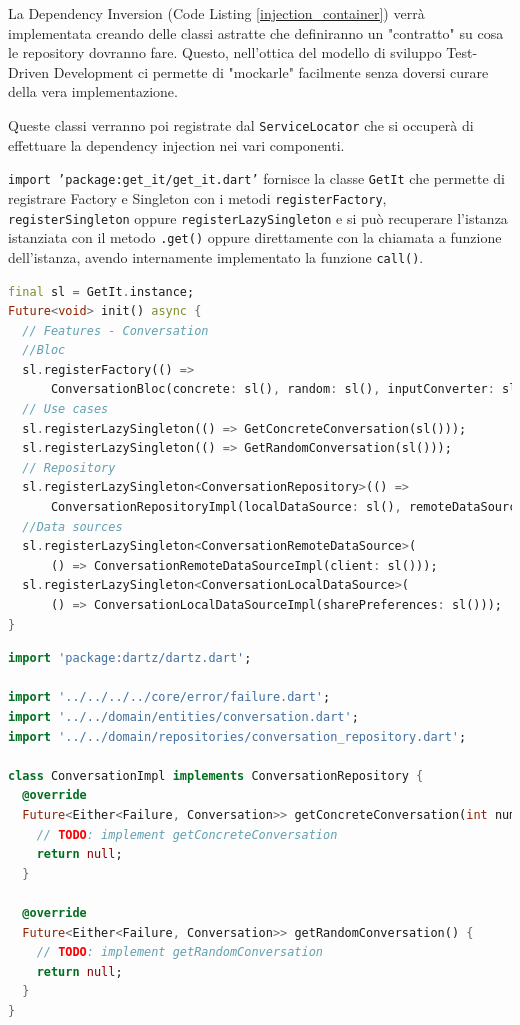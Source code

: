 La Dependency Inversion (Code Listing \ref{injection_container}) verrà implementata creando delle classi astratte che definiranno un "contratto" su cosa le repository dovranno fare. Questo, nell'ottica del modello di sviluppo Test-Driven Development ci permette di "mockarle" facilmente senza doversi curare della vera implementazione.

Queste classi verranno poi registrate dal \texttt{ServiceLocator} che si occuperà di effettuare la dependency injection nei vari componenti.

\texttt{import 'package:get\_it/get\_it.dart'} fornisce la classe \texttt{GetIt} che permette di registrare Factory e Singleton con i metodi \texttt{registerFactory}, \texttt{registerSingleton} oppure \texttt{registerLazySingleton} e si può recuperare l'istanza istanziata con il metodo \texttt{.get()} oppure direttamente con la chiamata a funzione dell'istanza, avendo internamente implementato la funzione \texttt{call()}.
\newpage
\begin{lstlisting}[language=dart,caption=injection\_container.dart,label=injection_container]
final sl = GetIt.instance;
Future<void> init() async {
  // Features - Conversation
  //Bloc
  sl.registerFactory(() =>
      ConversationBloc(concrete: sl(), random: sl(), inputConverter: sl()));
  // Use cases
  sl.registerLazySingleton(() => GetConcreteConversation(sl()));
  sl.registerLazySingleton(() => GetRandomConversation(sl()));
  // Repository
  sl.registerLazySingleton<ConversationRepository>(() =>
      ConversationRepositoryImpl(localDataSource: sl(), remoteDataSource: sl(), networkInfo: sl()));
  //Data sources
  sl.registerLazySingleton<ConversationRemoteDataSource>(
      () => ConversationRemoteDataSourceImpl(client: sl()));
  sl.registerLazySingleton<ConversationLocalDataSource>(
      () => ConversationLocalDataSourceImpl(sharePreferences: sl()));
}
\end{lstlisting}

\begin{lstlisting}[language=dart,caption=Data Layer: conversation\_repository\_impl.dart,label=conversation_repository_impl]
import 'package:dartz/dartz.dart';

import '../../../../core/error/failure.dart';
import '../../domain/entities/conversation.dart';
import '../../domain/repositories/conversation_repository.dart';

class ConversationImpl implements ConversationRepository {
  @override
  Future<Either<Failure, Conversation>> getConcreteConversation(int number) {
    // TODO: implement getConcreteConversation
    return null;
  }

  @override
  Future<Either<Failure, Conversation>> getRandomConversation() {
    // TODO: implement getRandomConversation
    return null;
  }
}
\end{lstlisting}
